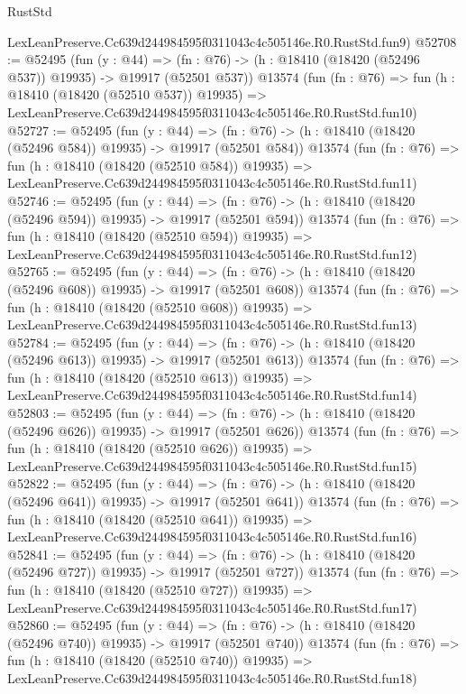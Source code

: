 \begin{lexlean}{RustStd}
\begin{coremodule}
    LexLeanPreserve.Cc639d244984595f0311043c4c505146e.R0.RustStd.fun9)
@52708 := @52495
    (fun (y : @44) =>
    (fn : @76) -> (h : @18410 (@18420 (@52496 @537)) @19935) -> @19917 (@52501 @537))
    @13574
    (fun (fn : @76) =>
    fun (h : @18410 (@18420 (@52510 @537)) @19935) =>
    LexLeanPreserve.Cc639d244984595f0311043c4c505146e.R0.RustStd.fun10)
@52727 := @52495
    (fun (y : @44) =>
    (fn : @76) -> (h : @18410 (@18420 (@52496 @584)) @19935) -> @19917 (@52501 @584))
    @13574
    (fun (fn : @76) =>
    fun (h : @18410 (@18420 (@52510 @584)) @19935) =>
    LexLeanPreserve.Cc639d244984595f0311043c4c505146e.R0.RustStd.fun11)
@52746 := @52495
    (fun (y : @44) =>
    (fn : @76) -> (h : @18410 (@18420 (@52496 @594)) @19935) -> @19917 (@52501 @594))
    @13574
    (fun (fn : @76) =>
    fun (h : @18410 (@18420 (@52510 @594)) @19935) =>
    LexLeanPreserve.Cc639d244984595f0311043c4c505146e.R0.RustStd.fun12)
@52765 := @52495
    (fun (y : @44) =>
    (fn : @76) -> (h : @18410 (@18420 (@52496 @608)) @19935) -> @19917 (@52501 @608))
    @13574
    (fun (fn : @76) =>
    fun (h : @18410 (@18420 (@52510 @608)) @19935) =>
    LexLeanPreserve.Cc639d244984595f0311043c4c505146e.R0.RustStd.fun13)
@52784 := @52495
    (fun (y : @44) =>
    (fn : @76) -> (h : @18410 (@18420 (@52496 @613)) @19935) -> @19917 (@52501 @613))
    @13574
    (fun (fn : @76) =>
    fun (h : @18410 (@18420 (@52510 @613)) @19935) =>
    LexLeanPreserve.Cc639d244984595f0311043c4c505146e.R0.RustStd.fun14)
@52803 := @52495
    (fun (y : @44) =>
    (fn : @76) -> (h : @18410 (@18420 (@52496 @626)) @19935) -> @19917 (@52501 @626))
    @13574
    (fun (fn : @76) =>
    fun (h : @18410 (@18420 (@52510 @626)) @19935) =>
    LexLeanPreserve.Cc639d244984595f0311043c4c505146e.R0.RustStd.fun15)
@52822 := @52495
    (fun (y : @44) =>
    (fn : @76) -> (h : @18410 (@18420 (@52496 @641)) @19935) -> @19917 (@52501 @641))
    @13574
    (fun (fn : @76) =>
    fun (h : @18410 (@18420 (@52510 @641)) @19935) =>
    LexLeanPreserve.Cc639d244984595f0311043c4c505146e.R0.RustStd.fun16)
@52841 := @52495
    (fun (y : @44) =>
    (fn : @76) -> (h : @18410 (@18420 (@52496 @727)) @19935) -> @19917 (@52501 @727))
    @13574
    (fun (fn : @76) =>
    fun (h : @18410 (@18420 (@52510 @727)) @19935) =>
    LexLeanPreserve.Cc639d244984595f0311043c4c505146e.R0.RustStd.fun17)
@52860 := @52495
    (fun (y : @44) =>
    (fn : @76) -> (h : @18410 (@18420 (@52496 @740)) @19935) -> @19917 (@52501 @740))
    @13574
    (fun (fn : @76) =>
    fun (h : @18410 (@18420 (@52510 @740)) @19935) =>
    LexLeanPreserve.Cc639d244984595f0311043c4c505146e.R0.RustStd.fun18)

\end{coremodule}
\end{lexlean}
